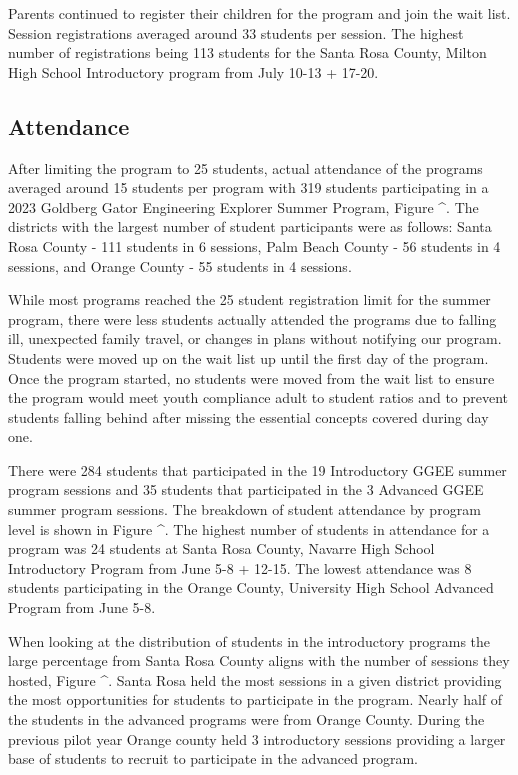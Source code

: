 \documentclass[
]{article}
\begin{document}
Parents continued to register their children for the program and join
the wait list. Session registrations averaged around 33 students per
session. The highest number of registrations being 113 students for the
Santa Rosa County, Milton High School Introductory program from July
10-13 + 17-20.

\hypertarget{attendance}{%
\subsection{Attendance}\label{attendance}}

After limiting the program to 25 students, actual attendance of the
programs averaged around 15 students per program with 319 students
participating in a 2023 Goldberg Gator Engineering Explorer Summer
Program, Figure \^{}. The districts with the largest number of student
participants were as follows: Santa Rosa County - 111 students in 6
sessions, Palm Beach County - 56 students in 4 sessions, and Orange
County - 55 students in 4 sessions.

While most programs reached the 25 student registration limit for the
summer program, there were less students actually attended the programs
due to falling ill, unexpected family travel, or changes in plans
without notifying our program. Students were moved up on the wait list
up until the first day of the program. Once the program started, no
students were moved from the wait list to ensure the program would meet
youth compliance adult to student ratios and to prevent students falling
behind after missing the essential concepts covered during day one.

There were 284 students that participated in the 19 Introductory GGEE
summer program sessions and 35 students that participated in the 3
Advanced GGEE summer program sessions. The breakdown of student
attendance by program level is shown in Figure \^{}. The highest number
of students in attendance for a program was 24 students at Santa Rosa
County, Navarre High School Introductory Program from June 5-8 + 12-15.
The lowest attendance was 8 students participating in the Orange County,
University High School Advanced Program from June 5-8.

When looking at the distribution of students in the introductory
programs the large percentage from Santa Rosa County aligns with the
number of sessions they hosted, Figure \^{}. Santa Rosa held the most
sessions in a given district providing the most opportunities for
students to participate in the program. Nearly half of the students in
the advanced programs were from Orange County. During the previous pilot
year Orange county held 3 introductory sessions providing a larger base
of students to recruit to participate in the advanced program.
\end{document}
